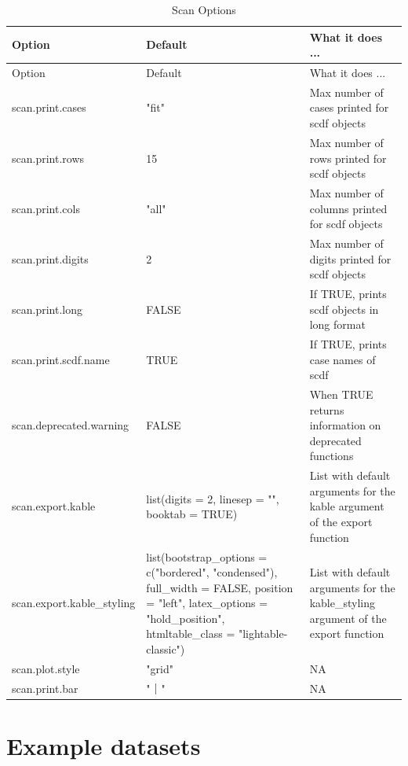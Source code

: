 \documentclass[
  letterpaper,
  DIV=11,
  numbers=noendperiod]{scrreprt}
\begin{document}
\hypertarget{tbl-options}{}
\begin{longtable}[]{@{}lll@{}}
\caption{\label{tbl-options}Scan Options}\tabularnewline
\toprule()
Option & Default & What it does ... \\
\midrule()
\endfirsthead
\toprule()
Option & Default & What it does ... \\
\midrule()
\endhead
scan.print.cases & "fit" & Max number of cases printed for scdf
objects \\
scan.print.rows & 15 & Max number of rows printed for scdf objects \\
scan.print.cols & "all" & Max number of columns printed for scdf
objects \\
scan.print.digits & 2 & Max number of digits printed for scdf objects \\
scan.print.long & FALSE & If TRUE, prints scdf objects in long format \\
scan.print.scdf.name & TRUE & If TRUE, prints case names of scdf \\
scan.deprecated.warning & FALSE & When TRUE returns information on
deprecated functions \\
scan.export.kable & list(digits = 2, linesep = "", booktab = TRUE) &
List with default arguments for the kable argument of the export
function \\
scan.export.kable\_styling & list(bootstrap\_options = c("bordered",
"condensed"), full\_width = FALSE, position = "left", latex\_options =
"hold\_position", htmltable\_class = "lightable-classic") & List with
default arguments for the kable\_styling argument of the export
function \\
scan.plot.style & "grid" & NA \\
scan.print.bar & "｜" & NA \\
\bottomrule()
\end{longtable}

\hypertarget{example-datasets}{%
\chapter{Example datasets}\label{example-datasets}}
\end{document}
